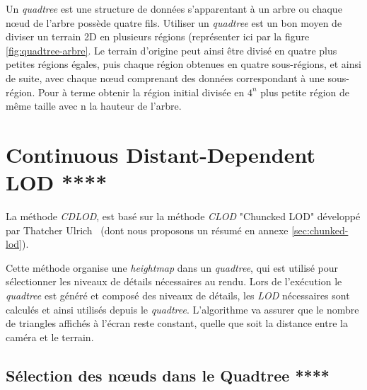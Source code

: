  Un \emph{quadtree} est une structure de données s'apparentant à un arbre ou chaque n\oe{}ud de l'arbre possède quatre fils. Utiliser un \emph{quadtree} est un bon moyen de diviser un terrain 2D en plusieurs régions (représenter ici par la figure \ref{fig:quadtree-arbre}. Le terrain d'origine peut ainsi être divisé en quatre plus petites régions égales, puis chaque région obtenues en quatre sous-régions, et ainsi de suite, avec chaque n\oe{}ud comprenant des données correspondant à une sous-région. Pour à terme obtenir la région initial divisée en $4^n$ plus petite région de même taille avec n la hauteur de l'arbre.

  
\vspace{1.5cm}

\section{Continuous Distant-Dependent LOD ****}


  La méthode \textit{CDLOD}, est basé sur la méthode \textit{CLOD} "Chuncked LOD" développé par Thatcher Ulrich~\cite{CLOD} (dont nous proposons un résumé en annexe \ref{sec:chunked-lod}).
  

  Cette méthode organise une \emph{heightmap} dans un \emph{quadtree}, qui est utilisé pour sélectionner les niveaux de détails nécessaires au rendu. Lors de l'exécution le \emph{quadtree} est généré et composé des niveaux de détails, les \emph{LOD} nécessaires sont calculés et ainsi utilisés depuis le \emph{quadtree}. L'algorithme va assurer que le nombre de triangles affichés à l'écran reste constant, quelle que soit la distance entre la caméra et le terrain.
  
 \subsection{Sélection des n\oe{}uds dans le Quadtree ****}
 
